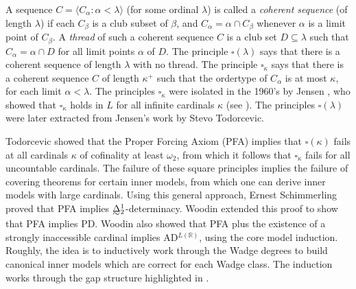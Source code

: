 \documentclass{book}%
\def\underTilde#1{{\baselineskip=0pt\vtop{\hbox{$#1$}\hbox{$\sim$}}}{}}
\newcommand{\uTDelta}{\underTilde{\Delta}}
\begin{document}


A sequence $C = \langle C_{\alpha} : \alpha < \lambda \rangle$ (for
some ordinal $\lambda$) is called a \emph{coherent sequence} (of
length $\lambda$) if each $C_{\beta}$ is a club subset of $\beta$,
and $C_{\alpha} = \alpha \cap C_{\beta}$ whenever $\alpha$ is a
limit point of $C_{\beta}$. A \emph{thread} of such a coherent
sequence $C$ is a club set $D \subseteq \lambda$ such that
$C_{\alpha} = \alpha \cap D$ for all limit points $\alpha$ of $D$.
The principle $\square(\lambda)$ says that there is a coherent
sequence of length $\lambda$ with no thread. The principle
$\square_{\kappa}$ says that there is a coherent sequence $C$ of
length $\kappa^{+}$ such that the ordertype of $C_{\alpha}$ is at
most $\kappa$, for each limit $\alpha < \lambda$. The principles $\square_{\kappa}$
were isolated in the 1960's by Jensen ,
who showed that $\square_{\kappa}$ holds in $L$ for all
infinite cardinals $\kappa$ (see \cite[p.~141]{Devlin}). The principles $\square(\lambda)$
were later extracted from Jensen's work by Stevo Todorcevic.


Todorcevic 
showed that the Proper Forcing Axiom (PFA) implies that
$\square(\kappa)$ fails at all cardinals $\kappa$ of cofinality at
least $\omega_{2}$, from which it follows that $\square_{\kappa}$
fails for all uncountable cardinals. The failure of these square
principles implies the failure of covering theorems for certain
inner models, from which one can derive inner models with large
cardinals. Using this general approach, Ernest
Schimmerling  proved that
PFA implies $\uTDelta^{1}_{2}$-determinacy. Woodin
extended this proof to show that PFA implies PD.
Woodin also showed that PFA plus the existence
of a strongly inaccessible cardinal implies AD$^{L(\mathbb{R})}$,
using the core model induction.
Roughly, the idea is to inductively work through the Wadge degrees
to build canonical inner models which are correct for each Wadge
class. The induction works through the gap structure highlighted in
\cite{Steel:1983}.
\end{document}
